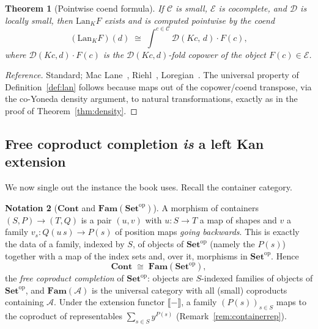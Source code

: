 \documentclass[11pt]{article}
\theoremstyle{plain}
\newtheorem{theorem}{Theorem}[section]
\theoremstyle{definition}
\newtheorem{notation}[theorem]{Notation}
\newcommand{\Set}{\mathbf{Set}}
\newcommand{\Cont}{\mathbf{Cont}}
\newcommand{\Fam}{\mathbf{Fam}}
\newcommand{\op}{^{\mathrm{op}}}
\newcommand{\Lan}{\mathrm{Lan}}
\newcommand{\iso}{\cong}
\newcommand{\ext}[1]{\llbracket #1 \rrbracket}
\begin{document}
\begin{theorem}[Pointwise coend formula]
\label{thm:lancoend}
If $\mathcal{C}$ is small, $\mathcal{E}$ is cocomplete, and $\mathcal{D}$ is
locally small, then $\Lan_{K}F$ exists and is computed pointwise by the coend
\[
  (\Lan_{K}F)(d) \;\iso\; \int^{c\in\mathcal{C}} \mathcal{D}(Kc,\,d)\cdot F(c),
\]
where $\mathcal{D}(Kc,d)\cdot F(c)$ is the $\mathcal{D}(Kc,d)$-fold copower of the
object $F(c)\in\mathcal{E}$.
\end{theorem}

\begin{proof}[Reference]
Standard; Mac Lane~\cite[Ch.~X, \S4]{MacLane}, Riehl~\cite[\S6.2]{Riehl},
Loregian~\cite[Ch.~2]{Loregian}. The universal property of
Definition~\ref{def:lan} follows because maps out of the copower/coend transpose,
via the co-Yoneda density argument, to natural transformations, exactly as in the
proof of Theorem~\ref{thm:density}. \end{proof}

\subsection{Free coproduct completion \emph{is} a left Kan extension}

We now single out the instance the book uses. Recall the container category.

\begin{notation}[$\Cont$ and $\Fam(\Set\op)$]
\label{not:cont}
A morphism of containers $(S,P)\to(T,Q)$ is a pair $(u,v)$ with
$u\colon S\to T$ a map of shapes and $v$ a family
$v_{s}\colon Q(u\,s)\to P(s)$ of position maps \emph{going backwards}. This is
exactly the data of a family, indexed by $S$, of objects of $\Set\op$ (namely the
$P(s)$) together with a map of the index sets and, over it, morphisms in
$\Set\op$. Hence
\[
  \Cont \;\iso\; \Fam(\Set\op),
\]
the \emph{free coproduct completion} of $\Set\op$: objects are $S$-indexed
families of objects of $\Set\op$, and $\Fam(\mathcal{A})$ is the universal
category with all (small) coproducts containing $\mathcal{A}$. Under the
extension functor $\ext{-}$, a family $(P(s))_{s\in S}$ maps to the coproduct of
representables $\sum_{s\in S} y^{P(s)}$ (Remark~\ref{rem:containerrep}).
\end{notation}
\end{document}
